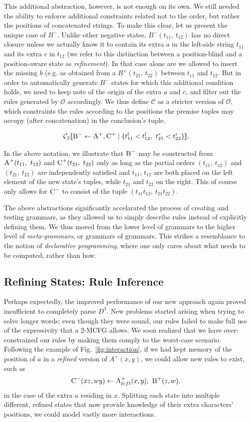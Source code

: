 \documentclass[nonatbib,numbers,10pt]{llncs}
\newcommand\s{\textsc}
\newcommand{\Order}[5]{
	\[
	\mathcal{#1}_{#5}\llbracket #2 \leftarrow #3 \mid \{ #4 \} \rrbracket.
	\]
}
\newcommand{\Con}[4]{\Order{C}{#1}{#2}{#3}{#4}}
\begin{document}
This additional abstraction, however, is not enough on its own. We still needed the ability to enforce additional constraints related not to the order, but rather the positions of concatenated strings. To make this clear, let us present the unique case of $B^{-}$. Unlike other negative states, $B^{-}(t_{11},\ t_{12})$ has no direct closure unless we actually know it to contain its extra $a$ in the left-side string $t_{11}$ and its extra $c$ in $t_{12}$ (we refer to this distinction between a position-blind and a position-aware state as \textit{refinement}). In that case alone are we allowed to insert the missing $b$ (e.g. as obtained from a $B^{+}(t_{21},\ t_{22})$ between $t_{11}$ and $t_{12}$. But in order to automatically generate $B^{-}$ states for which this additional condition holds, we need to keep note of the origin of the extra $a$ and $c$, and filter out the rules generated by $\mathcal{O}$ accordingly. We thus define $\mathcal{C}$ as a stricter version of $\mathcal{O}$, which constraints the rules according to the positions the premise tuples may occupy (after concatenation) in the conclusion's tuple.
\Con{\textsc{B}^-}{\textsc{A}^+, \textsc{C}^+}{t_{11}^l < t_{12}^l,\ t_{21}^r < t_{22}^r}{2}
In the above notation, we illustrate that $\textsc{B}^{-}$ may be constructed from $\textsc{A}^{+}(t_{11},\ t_{12})$ and $\textsc{C}^{+}(t_{21},\ t_{22})$ only as long as the partial orders $(t_{11},\ t_{12})$ and $(t_{21},\ t_{22})$ are independently satisfied and $t_{11}$, $t_{12}$ are both placed on the left element of the new state's tuples, while $t_{21}$ and $t_{22}$ on the right. This of course only allows for $\textsc{C}^{-}$ to consist of the tuple $(t_{11}t_{12},\ t_{21}t_{22})$.

The above abstractions significantly accelarated the process of creating and testing grammars, as they allowed us to simply describe rules instead of explicitly defining them. We thus moved from the lower level of grammars to the higher level of \textit{meta-grammars}, or grammars of grammars. This strikes a resemblance to the notion of \textit{declarative programming}, where one only cares about what needs to be computed, rather than how.

\subsection{Refining States: Rule Inference}\label{aris}	
Perhaps expectedly, the improved performance of our new approach again proved insufficient to completely parse $D^3$. New problems started arising when trying to solve longer words; even though they were sound, our rules failed to make full use of the expressivity that a 2-MCFG allows. We soon realized that we have over-constrained our rules by making them comply to the worst-case scenario. Following the example of Fig.~\ref{fig:interaction}, if we had kept memory of the position of $a$ in a \textit{refined} version of  $A^{+}(x,y)$, we could allow new rules to exist, such as \[\s{C}^-(xz,wy) \leftarrow \s{A}^+_{left}(x,y),\ \s{B}^+(z,w).\] in the case of the extra $a$ residing in $x$. Splitting each state into multiple different, refined states that now provide knowledge of their extra characters' positions, we could model vastly more interactions.
\end{document}
